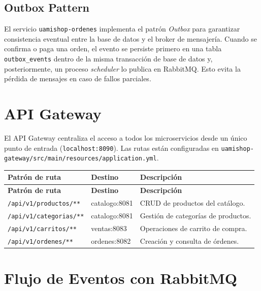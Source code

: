 \documentclass[12pt,a4paper]{article}
\begin{document}
\subsection{Outbox Pattern}

El servicio \texttt{uamishop-ordenes} implementa el patr\'on \textit{Outbox} para
garantizar consistencia eventual entre la base de datos y el broker de mensajer\'ia.
Cuando se confirma o paga una orden, el evento se persiste primero en una tabla
\texttt{outbox\_events} dentro de la misma transacci\'on de base de datos y,
posteriormente, un proceso \textit{scheduler} lo publica en RabbitMQ. Esto evita
la p\'erdida de mensajes en caso de fallos parciales.

\section{API Gateway}

El API Gateway centraliza el acceso a todos los microservicios desde un \'unico punto
de entrada (\texttt{localhost:8090}). Las rutas est\'an configuradas en
\texttt{uamishop-gateway/src/main/resources/application.yml}.

\begin{longtable}{@{}p{5cm}p{2.5cm}p{6cm}@{}}
  \toprule
  \textbf{Patr\'on de ruta} & \textbf{Destino} & \textbf{Descripci\'on} \\
  \midrule
  \endfirsthead
  \toprule
  \textbf{Patr\'on de ruta} & \textbf{Destino} & \textbf{Descripci\'on} \\
  \midrule
  \endhead
  \bottomrule
  \endfoot
  \texttt{/api/v1/productos/**}   & catalogo:8081  & CRUD de productos del cat\'alogo. \\[4pt]
  \texttt{/api/v1/categorias/**}  & catalogo:8081  & Gesti\'on de categor\'ias de productos. \\[4pt]
  \texttt{/api/v1/carritos/**}    & ventas:8083    & Operaciones de carrito de compra. \\[4pt]
  \texttt{/api/v1/ordenes/**}     & ordenes:8082   & Creaci\'on y consulta de \'ordenes. \\
\end{longtable}

\section{Flujo de Eventos con RabbitMQ}
\end{document}
